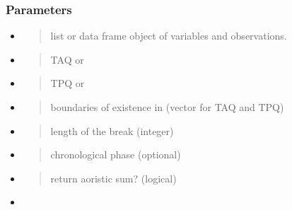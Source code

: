 \documentclass[a4paper,12pt,english]{sphinxhowto}
\begin{document}
\subsubsection{Parameters}
\label{\detokenize{Uncertainty:parameters}}\begin{itemize}
\item {} 
\begin{quote}

list or data frame object of variables and observations.
\end{quote}

\item {} 
\begin{quote}

TAQ or 
\end{quote}

\item {} 
\begin{quote}

TPQ or 
\end{quote}

\item {} 
\begin{quote}

boundaries of existence in  (vector for TAQ and TPQ)
\end{quote}

\item {} 
\begin{quote}

length of the break (integer)
\end{quote}

\item {} 
\begin{quote}

chronological phase (optional)
\end{quote}

\item {} 
\begin{quote}

return aoristic sum? (logical)
\end{quote}

\item {} 
\begin{quote}


\end{quote}
\end{itemize}
\end{document}
